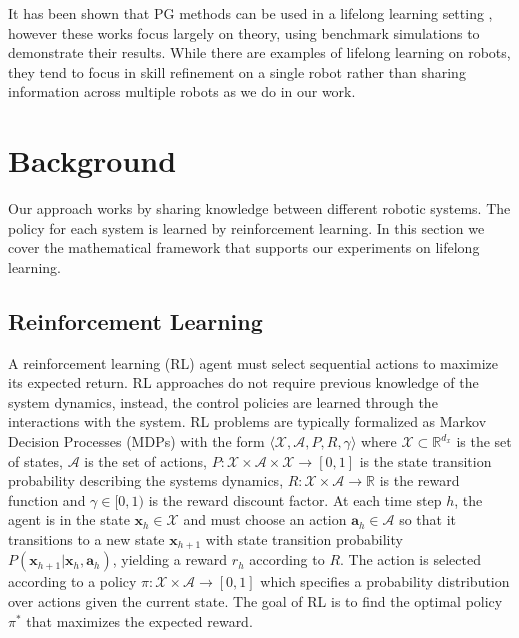 \documentclass{aamas2016}
\renewcommand{\Re}{\mathbb{R}}
\begin{document}
It has been shown that PG methods can be used in a lifelong learning setting \cite{BouAmmar2014a,bouAmmar2015unsupervised}, however these works focus largely on theory, using benchmark simulations to demonstrate their results. While there are examples of lifelong learning on robots, they tend to focus in skill refinement on a single robot \cite{kleiner2002towards,thrun1995lifelong} rather than sharing information across multiple robots as we do in our work. 



\section{Background} \label{background}
Our approach works by sharing knowledge between different robotic systems. The policy for each system is learned by reinforcement learning. In this section we cover the mathematical framework that supports our experiments on lifelong learning.

\subsection{Reinforcement Learning}

A reinforcement learning (RL) agent must select sequential actions to maximize its expected return. RL approaches do not 
require previous knowledge of the system dynamics, instead, the control policies are learned through the interactions with the system.
RL problems are typically formalized as Markov Decision Processes (MDPs) with the form $\langle \mathcal{X}, \mathcal{A}, P, R, \gamma \rangle$ where
$\mathcal{X}\subset\Re^{d_{x}}$ is the set of states, $\mathcal{A}$ is the set of actions, 
$P:\mathcal{X}\times \mathcal{A}\times \mathcal{X}\rightarrow [0,1]$ is the state transition probability describing the systems dynamics,
$R:\mathcal{X}\times \mathcal{A} \rightarrow \Re$ is the reward function and $\gamma \in [0,1)$ is the reward discount factor. At each time 
step $h$, the agent is in the state $\mathbf{x}_{h} \in \mathcal{X}$ and must choose an action $\mathbf{a}_{h} \in \mathcal{A}$ so that
it transitions to a new state $\mathbf{x}_{h+1}$ with state transition probability 
$P(\mathbf{x}_{h+1}|\mathbf{x}_{h},\mathbf{a}_{h})$, yielding 
a reward $r_{h}$ according to $R$. The action is selected according to a policy $\pi:\mathcal{X}\times \mathcal{A} \rightarrow [0,1]$ which
specifies a probability distribution over actions given the current state. The goal of RL is to find the optimal policy $\pi^{*}$ 
that maximizes the expected reward.
\end{document}
